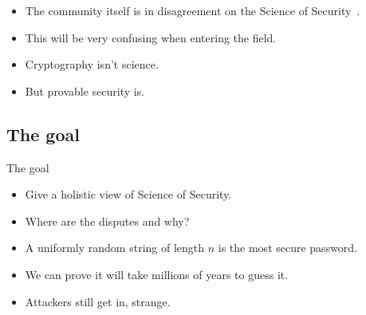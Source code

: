 \begin{frame}
  \begin{remark}
    \begin{itemize}
      \item The community itself is in disagreement on the Science of 
        Security~\cite{SecurityAsAScience}.
      \item This will be very confusing when entering the field.
    \end{itemize}
  \end{remark}

  \pause

  \begin{example}
    \begin{itemize}
      \item Cryptography isn't science.
      \item But provable security is.
    \end{itemize}
  \end{example}
\end{frame}


\subsection{The goal}

\begin{frame}
  \begin{block}{The goal}
    \begin{itemize}
      \item Give a holistic view of Science of Security.

        \pause

      \item Where are the disputes and why?
    \end{itemize}
  \end{block}
\end{frame}

\begin{frame}
  \begin{example}
    \begin{itemize}
      \item A uniformly random string of length \(n\) is the most secure 
        password.

      \item We can prove it will take millions of years to guess it.
    \end{itemize}
  \end{example}

  \pause

  \begin{remark}
    \begin{itemize}
      \item Attackers still get in, strange.
    \end{itemize}
  \end{remark}
\end{frame}

